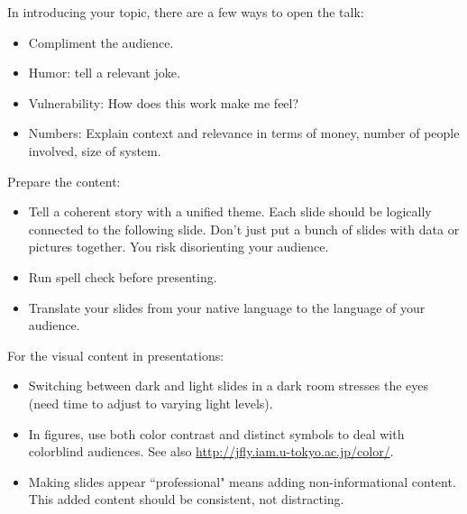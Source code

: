 In introducing your topic, there are a few ways to open the talk:
\begin{itemize}
    \item Compliment the audience.
    \item Humor: tell a relevant joke.
    \item Vulnerability: How does this work make me feel?
    \item Numbers: Explain context and relevance in terms of money, number of people involved, size of system.
\end{itemize}



Prepare the content:
\begin{itemize}
    \item Tell a coherent story with a unified theme. Each slide should be logically connected to the following slide. Don't just put a bunch of slides with data or pictures together. You risk disorienting your audience.
    \item Run spell check before presenting.
    \item Translate your slides from your native language to the language of your audience.
\end{itemize}


For the visual content in presentations:
\begin{itemize}
    \item Switching between dark and light slides in a dark room stresses the eyes (need time to adjust to varying light levels).
    \item In figures, use both color contrast and distinct symbols to deal with colorblind audiences. See also \href{http://jfly.iam.u-tokyo.ac.jp/color/}{http://jfly.iam.u-tokyo.ac.jp/color/}.
    \item Making slides appear ``professional" means adding non-informational content. This added content should be consistent, not distracting.
\end{itemize}

